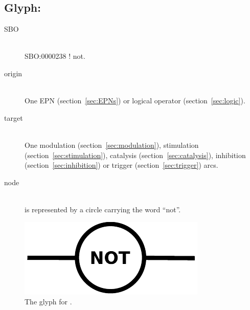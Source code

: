 \subsection{Glyph: }\label{sec:not}

\begin{description}
 \item[SBO]\mbox{}\\ SBO:0000238 ! not.
 \item[origin]\mbox{}\\ One EPN (section~\ref{sec:EPNs}) or logical operator (section~\ref{sec:logic}).
 \item[target]\mbox{}\\  One modulation (section~\ref{sec:modulation}), stimulation (section~\ref{sec:stimulation}), catalysis (section~\ref{sec:catalysis}), inhibition (section~\ref{sec:inhibition}) or trigger (section~\ref{sec:trigger}) arcs.
 \item[node]\mbox{}\\  is represented by a circle carrying the word ``not''.
 \end{description}

\begin{figure}[H]
  \centering
  \includegraphics[scale = 0.5]{images/not}
  \caption{The \PD glyph for .}
  \label{fig:not}
\end{figure}

